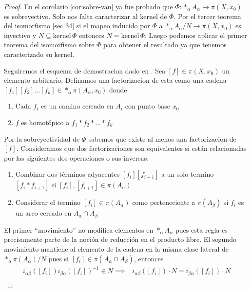 \begin{proof}
  En el corolario \ref{cor:sobre-van} ya fue probado que \(\Phi :
  *_\alpha A_\alpha \to \pi (X, x_0)\) es sobreyectivo. Solo nos falta
  caracterizar al kernel de \(\Phi\). Por el tercer teorema del
  isomorfismo \cite{Fraleigh}[sec 34]
  si el mapeo inducido por \(\Phi\) a \(*_\alpha A_\alpha / N \to \pi (X,
  x_0)\) es inyectivo y \(N \subseteq \text{kernel}\, \Phi\) entonces \(N =
  \text{kernel} \, \Phi\). Luego podemos aplicar el primer teorema del
  isomorfismo sobre \(\Phi\) para obtener el resultado ya que tenemos
  caracterizado su kernel.

  Seguiremos el esquema de demostracion dado en \cite{Bloom}. Sea \([f]
  \in \pi (X, x_0)\) un elemento arbitrario. Definamos una factorizacion
  de esta como una cadena \([f_1][f_2] ... [f_k] \in *_\alpha \pi
  (A_\alpha, x_0)\) donde
  \begin{enumerate}
  \item Cada \(f_i\) es un camino cerrado en \(A_i\) con punto base \(x_0\)
  \item \(f\) es homotópico a \(f_1 * f_2 * ... * f_k\)
  \end{enumerate}
  Por la sobreyectividad de \(\Phi\) sabemos que existe al menos una
  factorizacion de \([f]\).
  Consideramos que dos factorizaciones son equivalentes si están
  relacionadas por las siguientes dos operaciones o sus inversas:
  \begin{enumerate}
  \item Combinar dos términos adyacentes \([f_i][f_{i+1}]\) a un solo
    termino \([f_i * f_{i+1}]\) si \([f_i],[f_{i+1}] \in \pi
    (A_\alpha)\)
  \item Considerar el termino \([f_i] \in \pi (A_\alpha)\) como
    perteneciente a \(\pi (A_\beta)\) si \(f_i\) es un arco cerrado en
    \(A_\alpha \cap A_\beta\)
  \end{enumerate}
  El primer ``movimiento'' no modifica elementos en \(*_\alpha
  A_\alpha\) pues esta regla es precisamente parte de la noción
  de reducción en el producto libre. El segundo movimiento mantiene al
  elemento de la cadena en la misma clase lateral de \(*_\alpha \pi
  (A_\alpha) / N\) pues si \([f_i] \in \pi (A_\alpha \cap A_\beta)\),
  entonces
  \begin{align*}
    i_{\alpha \beta} \left( [f_i] \right) i_{\beta \alpha} \left( [f_i]
    \right)^{-1} \in N \implies
    &i_{\alpha \beta} \left( [f_i] \right) \cdot N = i_{\beta \alpha}
    \left( [f_i] \right) \cdot N \\

\end{align*}
\end{proof}
